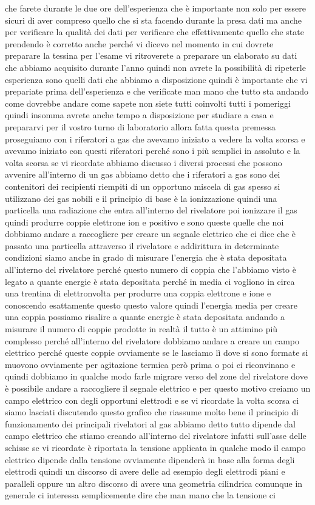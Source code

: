 che farete durante le due ore dell'esperienza che è importante non solo per essere sicuri di aver compreso quello che si sta facendo durante la presa dati ma anche per verificare la qualità dei dati per verificare che effettivamente quello che state prendendo è corretto anche perché vi dicevo nel momento in cui dovrete preparare la tessina per l'esame vi ritroverete a preparare un elaborato su dati che abbiamo acquisito durante l'anno quindi non avrete la possibilità di ripeterle esperienza sono quelli dati che abbiamo a disposizione quindi è importante che vi prepariate prima dell'esperienza e che verificate man mano che tutto sta andando come dovrebbe andare come sapete non siete tutti coinvolti tutti i pomeriggi quindi insomma avrete anche tempo a disposizione per studiare a casa e prepararvi per il vostro turno di laboratorio allora fatta questa premessa proseguiamo con i riferatori a gas che avevamo iniziato a vedere la volta scorsa e avevamo iniziato con questi riferatori perché sono i più semplici in assoluto e la volta scorsa se vi ricordate abbiamo discusso i diversi processi che possono avvenire all'interno di un gas abbiamo detto che i riferatori a gas sono dei contenitori dei recipienti riempiti di un opportuno miscela di gas spesso si utilizzano dei gas nobili e il principio di base è la ionizzazione quindi una particella una radiazione che entra all'interno del rivelatore poi ionizzare il gas quindi produrre coppie elettrone ion e positivo e sono queste quelle che noi dobbiamo andare a raccogliere per creare un segnale elettrico che ci dice che è passato una particella attraverso il rivelatore e addirittura in determinate condizioni siamo anche in grado di misurare l'energia che è stata depositata all'interno del rivelatore perché questo numero di coppia che l'abbiamo visto è legato a quante energie è stata depositata perché in media ci vogliono in circa una trentina di elettronvolta per produrre una coppia elettrone e ione e conoscendo esattamente questo questo valore quindi l'energia media per creare una coppia possiamo risalire a quante energie è stata depositata andando a misurare il numero di coppie prodotte in realtà il tutto è un attimino più complesso perché all'interno del rivelatore dobbiamo andare a creare un campo elettrico perché queste coppie ovviamente se le lasciamo lì dove si sono formate si muovono ovviamente per agitazione termica però prima o poi ci riconvinano e quindi dobbiamo in qualche modo farle migrare verso del zone del rivelatore dove è possibile andare a raccogliere il segnale elettrico e per questo motivo creiamo un campo elettrico con degli opportuni elettrodi e se vi ricordate la volta scorsa ci siamo lasciati discutendo questo grafico che riassume molto bene il principio di funzionamento dei principali rivelatori al gas abbiamo detto tutto dipende dal campo elettrico che stiamo creando all'interno del rivelatore infatti sull'asse delle schisse se vi ricordate è riportata la tensione applicata in qualche modo il campo elettrico dipende dalla tensione ovviamente dipenderà in base alla forma degli elettrodi quindi un discorso di avere delle ad esempio degli elettrodi piani e paralleli oppure un altro discorso di avere una geometria cilindrica comunque in generale ci interessa semplicemente dire che man mano che la tensione ci 